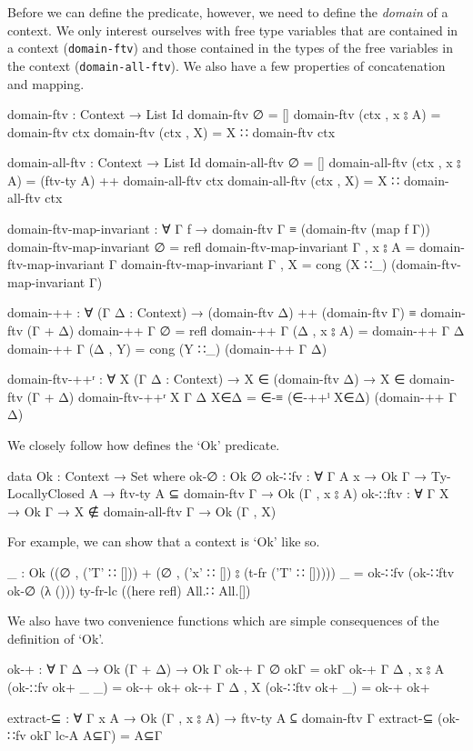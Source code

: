 \documentclass[logo,bsc,singlespacing,parskip,online]{infthesis}
\begin{document}
Before we can define the predicate, however, we need to define the \textit{domain} of a context. We
only interest ourselves with free type variables that are contained in a context
(\texttt{domain-ftv}) and those contained in the types of the free variables in the context
(\texttt{domain-all-ftv}). We also have a few properties of concatenation and mapping.
\begin{code}
  domain-ftv : Context → List Id
  domain-ftv ∅ = []
  domain-ftv (ctx , x ⦂ A) = domain-ftv ctx
  domain-ftv (ctx , X) = X ∷ domain-ftv ctx

  domain-all-ftv : Context → List Id
  domain-all-ftv ∅ = []
  domain-all-ftv (ctx , x ⦂ A) = (ftv-ty A) ++ domain-all-ftv ctx
  domain-all-ftv (ctx , X) = X ∷ domain-all-ftv ctx

  domain-ftv-map-invariant : ∀ {Γ f}
    → domain-ftv Γ ≡ (domain-ftv (map f Γ))
  domain-ftv-map-invariant {∅} = refl
  domain-ftv-map-invariant {Γ , x ⦂ A} =
    domain-ftv-map-invariant {Γ}
  domain-ftv-map-invariant {Γ , X} =
    cong (X ∷_) (domain-ftv-map-invariant {Γ})

  domain-++ : ∀ (Γ Δ : Context)
    → (domain-ftv Δ) ++ (domain-ftv Γ) ≡ domain-ftv (Γ + Δ)
  domain-++ Γ ∅ = refl
  domain-++ Γ (Δ , x ⦂ A) = domain-++ Γ Δ
  domain-++ Γ (Δ , Y) = cong (Y ∷_) (domain-++ Γ Δ)

  domain-ftv-++ʳ : ∀ {X} (Γ Δ : Context)
    → X ∈ (domain-ftv Δ) → X ∈ domain-ftv (Γ + Δ)
  domain-ftv-++ʳ {X} Γ Δ X∈Δ = ∈-≡ (∈-++ˡ X∈Δ) (domain-++ Γ Δ)
\end{code}

We closely follow how \citet{chargueraud_locally_2012} defines the `Ok' predicate.
\begin{code}
  data Ok : Context → Set where
    ok-∅ : Ok ∅
    ok-∷fv : ∀ {Γ A x} → Ok Γ → Ty-LocallyClosed A
      → ftv-ty A ⊆ domain-ftv Γ → Ok (Γ , x ⦂ A)
    ok-∷ftv : ∀ {Γ X} → Ok Γ → X ∉ domain-all-ftv Γ → Ok (Γ , X)
\end{code}

For example, we can show that a context is `Ok' like so.
\begin{code}
  _ : Ok ((∅ , ('T' ∷ [])) + (∅ , ('x' ∷ []) ⦂ (t-fr ('T' ∷ []))))
  _ = ok-∷fv
    (ok-∷ftv ok-∅ (λ ())) ty-fr-lc ((here refl) All.∷ All.[])
\end{code}

We also have two convenience functions which are simple consequences of the definition of `Ok'.
\begin{code}
  ok-+ : ∀ {Γ Δ} → Ok (Γ + Δ) → Ok Γ
  ok-+ {Γ} {∅} okΓ = okΓ
  ok-+ {Γ} {Δ , x ⦂ A} (ok-∷fv ok+ _ _) = ok-+ ok+
  ok-+ {Γ} {Δ , X} (ok-∷ftv ok+ _) = ok-+ ok+

  extract-⊆ : ∀ {Γ x A} → Ok (Γ , x ⦂ A) → ftv-ty A ⊆ domain-ftv Γ
  extract-⊆ (ok-∷fv okΓ lc-A A⊆Γ) = A⊆Γ
\end{code}
\end{document}
